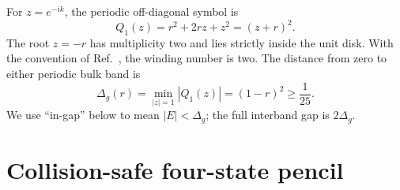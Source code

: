 \documentclass[aps,prb,reprint,superscriptaddress,longbibliography]{revtex4-2}
\begin{document}
For $z=e^{-ik}$, the periodic off-diagonal symbol is
\begin{equation}
 Q_1(z)=r^2+2rz+z^2=(z+r)^2.
 \label{eq:symbol}
\end{equation}
The root $z=-r$ has multiplicity two and lies strictly inside the unit disk.
With the convention of Ref.~\cite{Grizzi2026}, the winding number is two.
The distance from zero to either periodic bulk band is
\begin{equation}
 \Delta_g(r)=\min_{|z|=1}|Q_1(z)|=(1-r)^2\geq\frac1{25}.
 \label{eq:bulkgap}
\end{equation}
We use ``in-gap'' below to mean $|E|<\Delta_g$; the full interband gap is
$2\Delta_g$.

\section{Collision-safe four-state pencil}
\label{sec:pencil}
\end{document}
